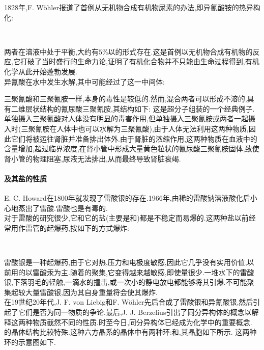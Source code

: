\documentclass{ctexart}
\begin{document}
\indent 1828年,F. Wöhler报道了首例从无机物合成有机物尿素的办法,即异氰酸铵的热异构化:
\begin{center}
    \\
\end{center}
两者在溶液中处于平衡,大约有$5\%$以的形式存在.这是首例以无机物合成有机物的反应,它打破了当时盛行的生命力论,证明了有机化合物并不只能由生命过程得到,有机化学从此开始蓬勃发展.\\
\indent 异氰酸在水中发生水解,其中可能经过了这一中间体:
\begin{center}
\end{center}
\indent 三聚氰酸和三聚氰胺一样,本身的毒性是较低的.然而,混合两者可以形成不溶的,具有二维层状结构的氰尿酸三聚氰胺,其结构如下:
这是超分子组装的一个经典例子.单独摄入三聚氰酸对人体没有明显的毒害作用,但单独摄入三聚氰胺或两者一起摄入时(三聚氰胺在人体中也可以水解为三聚氰酸),由于人体无法利用这两种物质,因此它们将被运往肾脏并准备排出体外.由于肾脏的浓缩作用,这两种物质在血液中的含量增加,超过临界浓度,在肾小管中形成大量黄色粒状的氰尿酸三聚氰胺固体,致使肾小管的物理阻塞,尿液无法排出,从而最终导致肾脏衰竭.
\paragraph{及其盐的性质}
E. C. Howard在1800年就发现了雷酸银的存在.1966年,由稀的雷酸钠溶液酸化后小心地蒸出了雷酸.雷酸也是有毒的.\\
\indent 对于雷酸的研究很少,它和它的盐(主要是和)都是不稳定而易爆的.这两种盐以前经常用作雷管的起爆药,按如下的方式爆炸:
\begin{center}
    \\
\end{center}
雷酸银是一种起爆药,由于它对热,压力和电极度敏感,因此它几乎没有实用价值,以前用的以雷酸汞为主.随着的聚集,它变得越来越敏感,即使量很少.一堆水下的雷酸银,下落羽毛的轻触,一滴水的撞击,或一次小的静电放电都能够将其引爆.不可能聚集起较大量雷酸银,因为其自身重量将会使其爆炸.\\
\indent 在19世纪20年代,J. F. von Liebig和F. Wöhler先后合成了雷酸银和异氰酸银,然后引起了它们是否为同一物质的争论.最后,J. J. Berzelius引出了同分异构体的概念以解释这两种物质截然不同的性质.时至今日,同分异构体已经成为化学中的重要概念.\\
\indent {}的晶体结构比较特殊.这种六方晶系的晶体中有两种环:和\ce{[Ag(CNO)6]},其晶胞如下所示.
这两种环的示意图如下.
\end{document}
